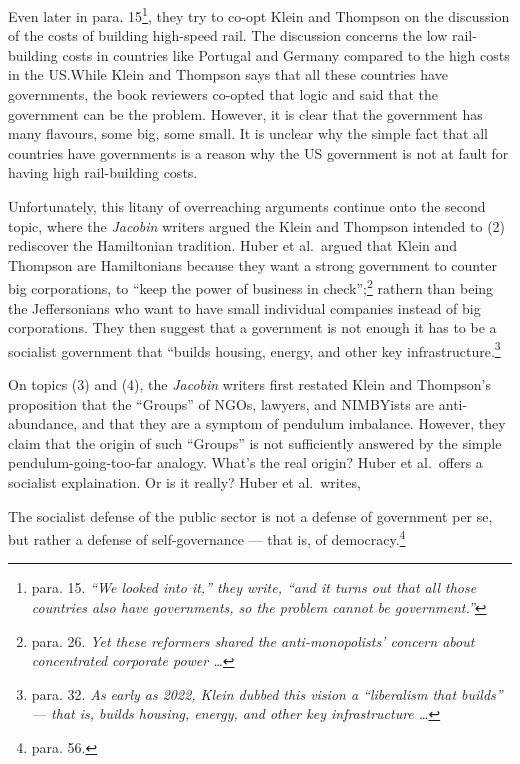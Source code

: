 \documentclass[12pt]{article}
\begin{document}
Even later in para. 15\footnote{para. 15. \textit{``We looked into it,'' they write, ``and it turns out that all those countries also have governments, so the problem cannot be government.''}}, they try to co-opt Klein and Thompson on the discussion of the costs of building high-speed rail. The discussion concerns the low rail-building costs in countries like Portugal and Germany compared to the high costs in the US.\@ While Klein and Thompson says that all these countries have governments, the book reviewers co-opted that logic and said that the government can be the problem. However, it is clear that the government has many flavours, some big, some small. It is unclear why the simple fact that all countries have governments is a reason why the US government is not at fault for having high rail-building costs.

Unfortunately, this litany of overreaching arguments continue onto the second topic, where the \textit{Jacobin} writers argued the Klein and Thompson intended to (2) rediscover the Hamiltonian tradition. Huber et al.\ argued that Klein and Thompson are Hamiltonians because they want a strong government to counter big corporations, to ``keep the power of business in check'';\footnote{para. 26. \textit{Yet these reformers shared the anti-monopolists’ concern about concentrated corporate power \dots}} rathern than being the Jeffersonians who want to have small individual companies instead of big corporations. They then suggest that a government is not enough\textemdash{} it has to be a socialist government that ``builds housing, energy, and other key infrastructure.\footnote{para. 32. \textit{As early as 2022, Klein dubbed this vision a “liberalism that builds” — that is, builds housing, energy, and other key infrastructure \dots}}

On topics (3) and (4), the \textit{Jacobin} writers first restated Klein and Thompson's proposition that the ``Groups'' of NGOs, lawyers, and NIMBYists are anti-abundance, and that they are a symptom of pendulum imbalance. However, they claim that the origin of such ``Groups'' is not sufficiently answered by the simple pendulum-going-too-far analogy. What's the real origin? Huber et al.\ offers a socialist explaination. Or is it really? Huber et al.\ writes,

	The socialist defense of the public sector is not a defense of government per se, but rather a defense of self-governance — that is, of democracy.\footnote{para. 56.}
\end{document}
